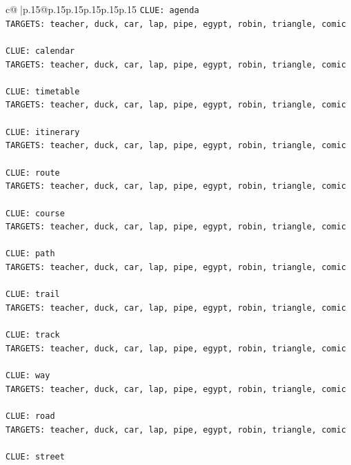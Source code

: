 \documentclass{article}
\begin{document}
{\begin{supertabular}{c@{$\;$}|p{.15\linewidth}@{}p{.15\linewidth}p{.15\linewidth}p{.15\linewidth}p{.15\linewidth}p{.15\linewidth}}
{{{\texttt{CLUE: agenda} \\
\texttt{TARGETS: teacher, duck, car, lap, pipe, egypt, robin, triangle, comic} \\
\\ 
\texttt{CLUE: calendar} \\
\texttt{TARGETS: teacher, duck, car, lap, pipe, egypt, robin, triangle, comic} \\
\\ 
\texttt{CLUE: timetable} \\
\texttt{TARGETS: teacher, duck, car, lap, pipe, egypt, robin, triangle, comic} \\
\\ 
\texttt{CLUE: itinerary} \\
\texttt{TARGETS: teacher, duck, car, lap, pipe, egypt, robin, triangle, comic} \\
\\ 
\texttt{CLUE: route} \\
\texttt{TARGETS: teacher, duck, car, lap, pipe, egypt, robin, triangle, comic} \\
\\ 
\texttt{CLUE: course} \\
\texttt{TARGETS: teacher, duck, car, lap, pipe, egypt, robin, triangle, comic} \\
\\ 
\texttt{CLUE: path} \\
\texttt{TARGETS: teacher, duck, car, lap, pipe, egypt, robin, triangle, comic} \\
\\ 
\texttt{CLUE: trail} \\
\texttt{TARGETS: teacher, duck, car, lap, pipe, egypt, robin, triangle, comic} \\
\\ 
\texttt{CLUE: track} \\
\texttt{TARGETS: teacher, duck, car, lap, pipe, egypt, robin, triangle, comic} \\
\\ 
\texttt{CLUE: way} \\
\texttt{TARGETS: teacher, duck, car, lap, pipe, egypt, robin, triangle, comic} \\
\\ 
\texttt{CLUE: road} \\
\texttt{TARGETS: teacher, duck, car, lap, pipe, egypt, robin, triangle, comic} \\
\\ 
\texttt{CLUE: street} \\
}}}
\end{supertabular}}
\end{document}

